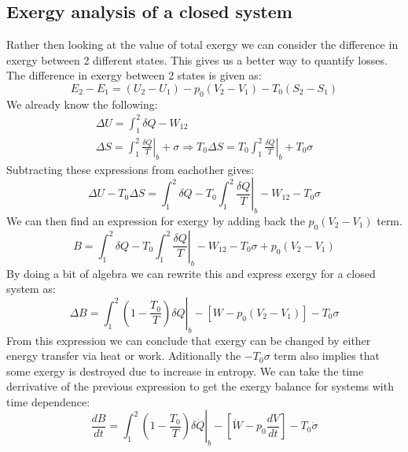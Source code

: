 \documentclass[11pt, a4paper]{article}
\begin{document}
\subsection{Exergy analysis of a closed system}
Rather then looking at the value of total exergy we can consider the difference in exergy between 2 different states. This gives us a better way to quantify losses. The difference in exergy between 2 states is given as:
\begin{equation}
  E_2 - E_1 = (U_2 - U_1) - p_0(V_2-V_1) - T_0(S_2-S_1)
\end{equation}
We already know the following:
\begin{gather}
  \Delta U = \int_1^2 \delta Q - W_{12}\\
  \Delta S = \left.\int_1^2 \frac{\delta Q}{T} \right|_b + \sigma \Rightarrow T_0\Delta S = T_0 \left.\int_1^2 \frac{\delta Q}{T} \right|_b + T_0\sigma
\end{gather}
Subtracting these expressions from eachother gives:
\begin{equation}
  \Delta U - T_0\Delta S = \int_1^2 \delta Q - T_0 \left.\int_1^2 \frac{\delta Q}{T} \right|_b -W_{12} - T_0\sigma
\end{equation}
We can then find an expression for exergy by adding back the $p_0(V_2 - V_1)$ term.
\begin{equation}
  B = \int_1^2 \delta Q - T_0 \left.\int_1^2 \frac{\delta Q}{T} \right|_b -W_{12} - T_0\sigma + p_0(V_2 - V_1)
\end{equation}
By doing a bit of algebra we can rewrite this and express exergy for a closed system as:
\begin{equation}
  \Delta B = \left. \int_1^2 \left(1 - \frac{T_0}{T}\right)\delta Q \right|_b - \left[ W - p_0(V_2 - V_1)\right] - T_0\sigma
\end{equation}
From this expression we can conclude that exergy can be changed by either energy transfer via heat or work. Aditionally the $-T_0\sigma$ term also implies that some exergy is destroyed due to increase in entropy. We can take the time derrivative of the previous expression to get the exergy balance for systems with time dependence:
\begin{equation}
  \frac{dB}{dt} = \left. \int_1^2 \left(1 - \frac{T_0}{T}\right)\delta\dot{Q} \right|_b - \left[ \dot{W} - p_0\frac{dV}{dt}\right] - T_0\dot{\sigma}
\end{equation}
\end{document}
